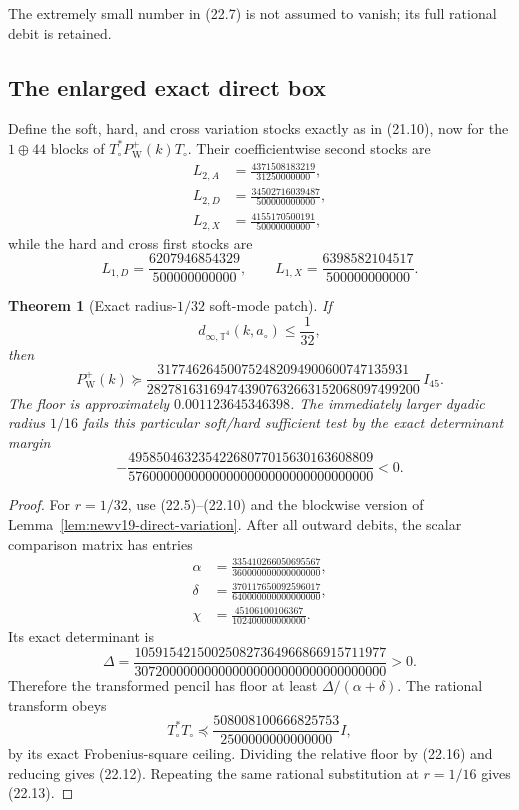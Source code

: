 \documentclass[11pt,oneside]{article}
\newtheorem{theorem}{Theorem}[section]
\theoremstyle{definition}
\theoremstyle{remark}
\begin{document}
The extremely small number in (22.7) is not assumed to vanish; its
full rational debit is retained.

\subsection{The enlarged exact direct box}

Define the soft, hard, and cross variation stocks exactly as in
(21.10), now for the \(1\oplus44\) blocks of
\(T_\circ^*P_{\mathrm W}^+(k)T_\circ\).  Their coefficientwise
second stocks are
\[
\begin{aligned}
 L_{2,A}&=\frac{4371508183219}{31250000000},\\
 L_{2,D}&=\frac{34502716039487}{500000000000},\\
 L_{2,X}&=\frac{4155170500191}{50000000000},
\end{aligned}                                            \tag{22.9}
\]
while the hard and cross first stocks are
\[
 L_{1,D}=\frac{6207946854329}{500000000000},\qquad
 L_{1,X}=\frac{6398582104517}{500000000000}.             \tag{22.10}
\]

\begin{theorem}[Exact radius-\(1/32\) soft-mode patch]
\label{thm:newv22-patch}
If
\[
 d_{\infty,\mathbb T^4}(k,a_\circ)\le\frac1{32},         \tag{22.11}
\]
then
\[
 P_{\mathrm W}^+(k)\succeq
 \frac{
317746264500752482094900600747135931}
{282781631694743907632663152068097499200}\,I_{45}.
                                                               \tag{22.12}
\]
The floor is approximately \(0.001123645346398\).
The immediately larger dyadic radius \(1/16\) fails this particular
soft/hard sufficient test by the exact determinant margin
\[
 -\frac{
49585046323542268077015630163608809}
{57600000000000000000000000000000000}<0.                \tag{22.13}
\]
\end{theorem}

\begin{proof}
For \(r=1/32\), use (22.5)--(22.10) and the blockwise version of
Lemma~\ref{lem:newv19-direct-variation}.  After all outward debits,
the scalar comparison matrix has entries
\[
\begin{aligned}
\alpha&=\frac{335410266050695567}{360000000000000000},\\
\delta&=\frac{370117650092596017}{640000000000000000},\\
\chi&=\frac{45106100106367}{102400000000000}.
\end{aligned}                                            \tag{22.14}
\]
Its exact determinant is
\[
 \Delta=
 \frac{
105915421500250827364966866915711977}
{307200000000000000000000000000000000}>0.               \tag{22.15}
\]
Therefore the transformed pencil has floor at least
\(\Delta/(\alpha+\delta)\).  The rational transform obeys
\[
 T_\circ^*T_\circ\preceq
 \frac{508008100666825753}{2500000000000000}I,           \tag{22.16}
\]
by its exact Frobenius-square ceiling.  Dividing the relative floor
by (22.16) and reducing gives (22.12).  Repeating the same rational
substitution at \(r=1/16\) gives (22.13).
\end{proof}
\end{document}
